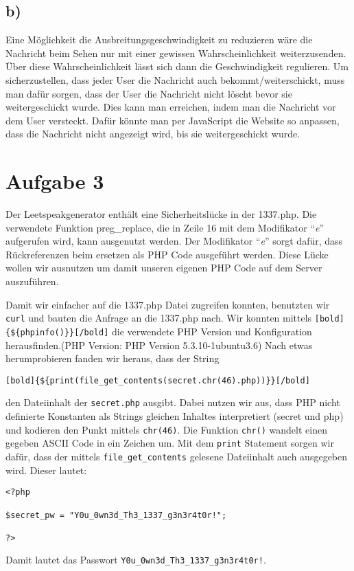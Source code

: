 \documentclass[10pt,a4paper]{article}
\begin{document}
\subsection*{b)}
Eine Möglichkeit die Ausbreitungsgeschwindigkeit zu reduzieren wäre die Nachricht beim Sehen nur mit einer gewissen Wahrscheinlichkeit weiterzusenden. Über diese Wahrscheinlichkeit lässt sich dann die Geschwindigkeit regulieren. Um sicherzustellen, dass jeder User die Nachricht auch bekommt/weiterschickt, muss man dafür sorgen, dass der User die Nachricht nicht löscht bevor sie weitergeschickt wurde. Dies kann man erreichen, indem man die Nachricht vor dem User versteckt. Dafür könnte man per JavaScript die Website so anpassen, dass die Nachricht nicht angezeigt wird, bis sie weitergeschickt wurde.

\section*{Aufgabe 3}

Der Leetspeakgenerator enthält eine Sicherheitslücke in der 1337.php. Die verwendete Funktion preg\_replace, die in Zeile 16 mit dem Modifikator "`\textit{e}"' aufgerufen wird, kann ausgenutzt werden. Der Modifikator "`\textit{e}"' sorgt dafür, dass Rückreferenzen beim ersetzen als PHP Code ausgeführt werden. Diese Lücke wollen wir ausnutzen um damit unseren eigenen PHP Code auf dem Server auszuführen.

 Damit wir einfacher auf die 1337.php Datei zugreifen konnten, benutzten wir \texttt{curl} und bauten die Anfrage an die 1337.php nach. Wir konnten mittels \texttt{[bold]\{\$\{phpinfo()\}\}[/bold]} die verwendete PHP Version und Konfiguration herausfinden.(PHP Version: PHP Version 5.3.10-1ubuntu3.6) Nach etwas herumprobieren fanden wir heraus, dass der String 
\begin{verbatim}
[bold]{${print(file_get_contents(secret.chr(46).php))}}[/bold] 
\end{verbatim}
den Dateiinhalt der \texttt{secret.php} ausgibt. Dabei nutzen wir aus, dass PHP nicht definierte Konstanten als Strings gleichen Inhaltes interpretiert (secret und php) und kodieren den Punkt mittels \texttt{chr(46)}. Die Funktion \texttt{chr()} wandelt einen gegeben ASCII Code in ein Zeichen um. Mit dem \texttt{print} Statement sorgen wir dafür, dass der mittels \texttt{file\_get\_contents} gelesene Dateiinhalt auch ausgegeben wird.
Dieser lautet:
\begin{verbatim}
<?php

$secret_pw = "Y0u_0wn3d_Th3_1337_g3n3r4t0r!";

?>
\end{verbatim}
Damit lautet das Passwort \texttt{Y0u\_0wn3d\_Th3\_1337\_g3n3r4t0r!}. 
\end{document}
